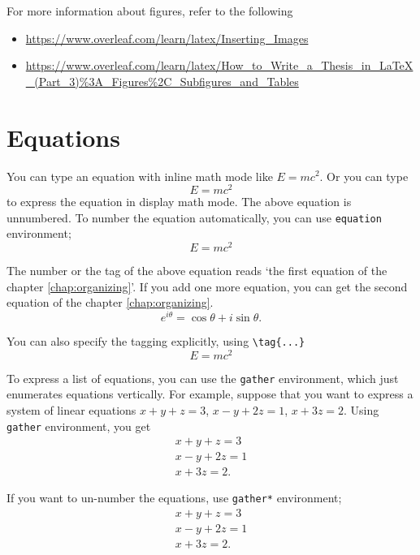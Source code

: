 For more information about figures, refer to the following
\begin{itemize}
\item
\url{https://www.overleaf.com/learn/latex/Inserting_Images}
\item
\url{https://www.overleaf.com/learn/latex/How_to_Write_a_Thesis_in_LaTeX_(Part_3)%3A_Figures%2C_Subfigures_and_Tables}
\end{itemize}


\section{Equations}\label{sec:equation}

You can type an equation with inline math mode like \(E=mc^2\). %
Or you can type
\[E=mc^2\]
to express the equation in display math mode.
The above equation is unnumbered.
To number the equation automatically, you can use \texttt{equation} environment;
\begin{equation}
E=mc^2
\end{equation}

The number or the tag of the above equation reads `the first equation of the chapter \ref{chap:organizing}'.
If you add one more equation, you can get the second equation of the chapter \ref{chap:organizing}.
\begin{equation}
e^{i\theta}=\cos\theta+i\sin\theta.
\end{equation}

You can also specify the tagging explicitly, using \verb|\tag{...}|
\[E=mc^2\tag{$*$}\]

To express a list of equations, you can use the \texttt{gather} environment, which just enumerates equations vertically.
For example, suppose that you want to express a system of linear equations \(x+y+z=3\), \(x-y+2z=1\), \(x+3z=2\).
Using \texttt{gather} environment, you get
\begin{gather}
x+y+z=3\\
x-y+2z=1\\
x+3z=2.
\end{gather}

If you want to un-number the equations, use \texttt{gather*} environment;
\begin{gather*}
x+y+z=3\\
x-y+2z=1\\
x+3z=2.
\end{gather*}

